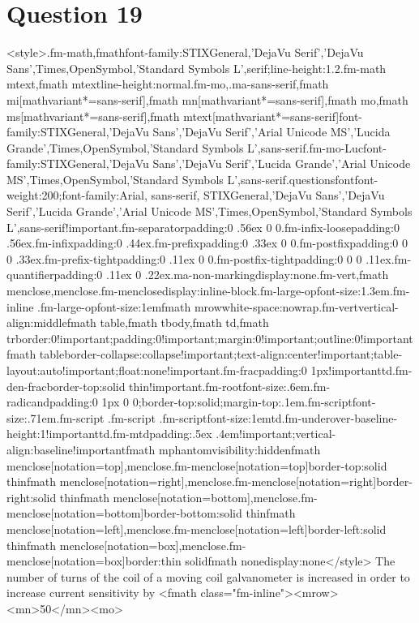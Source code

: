 \documentclass{article}
\begin{document}
\section*{Question 19}
<style>.fm-math,fmath{font-family:STIXGeneral,'DejaVu Serif','DejaVu Sans',Times,OpenSymbol,'Standard Symbols L',serif;line-height:1.2}.fm-math mtext,fmath mtext{line-height:normal}.fm-mo,.ma-sans-serif,fmath mi[mathvariant*=sans-serif],fmath mn[mathvariant*=sans-serif],fmath mo,fmath ms[mathvariant*=sans-serif],fmath mtext[mathvariant*=sans-serif]{font-family:STIXGeneral,'DejaVu Sans','DejaVu Serif','Arial Unicode MS','Lucida Grande',Times,OpenSymbol,'Standard Symbols L',sans-serif}.fm-mo-Luc{font-family:STIXGeneral,'DejaVu Sans','DejaVu Serif','Lucida Grande','Arial Unicode MS',Times,OpenSymbol,'Standard Symbols L',sans-serif}.questionsfont{font-weight:200;font-family:Arial, sans-serif, STIXGeneral,'DejaVu Sans','DejaVu Serif','Lucida Grande','Arial Unicode MS',Times,OpenSymbol,'Standard Symbols L',sans-serif!important}.fm-separator{padding:0 .56ex 0 0}.fm-infix-loose{padding:0 .56ex}.fm-infix{padding:0 .44ex}.fm-prefix{padding:0 .33ex 0 0}.fm-postfix{padding:0 0 0 .33ex}.fm-prefix-tight{padding:0 .11ex 0 0}.fm-postfix-tight{padding:0 0 0 .11ex}.fm-quantifier{padding:0 .11ex 0 .22ex}.ma-non-marking{display:none}.fm-vert,fmath menclose,menclose.fm-menclose{display:inline-block}.fm-large-op{font-size:1.3em}.fm-inline .fm-large-op{font-size:1em}fmath mrow{white-space:nowrap}.fm-vert{vertical-align:middle}fmath table,fmath tbody,fmath td,fmath tr{border:0!important;padding:0!important;margin:0!important;outline:0!important}fmath table{border-collapse:collapse!important;text-align:center!important;table-layout:auto!important;float:none!important}.fm-frac{padding:0 1px!important}td.fm-den-frac{border-top:solid thin!important}.fm-root{font-size:.6em}.fm-radicand{padding:0 1px 0 0;border-top:solid;margin-top:.1em}.fm-script{font-size:.71em}.fm-script .fm-script .fm-script{font-size:1em}td.fm-underover-base{line-height:1!important}td.fm-mtd{padding:.5ex .4em!important;vertical-align:baseline!important}fmath mphantom{visibility:hidden}fmath menclose[notation=top],menclose.fm-menclose[notation=top]{border-top:solid thin}fmath menclose[notation=right],menclose.fm-menclose[notation=right]{border-right:solid thin}fmath menclose[notation=bottom],menclose.fm-menclose[notation=bottom]{border-bottom:solid thin}fmath menclose[notation=left],menclose.fm-menclose[notation=left]{border-left:solid thin}fmath menclose[notation=box],menclose.fm-menclose[notation=box]{border:thin solid}fmath none{display:none}</style> The number of turns of the coil of a moving coil galvanometer is increased in order to increase current sensitivity by <fmath class="fm-inline"><mrow><mn>50</mn><mo>%
\end{document}
